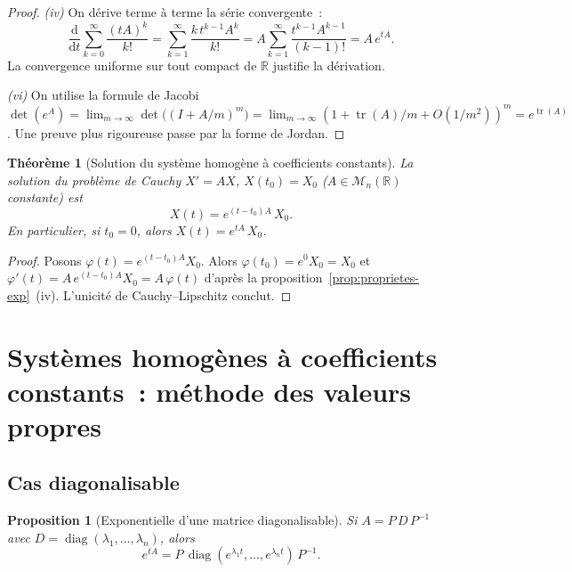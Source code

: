 \documentclass[12pt,a4paper,openany]{book}
\theoremstyle{definition}
\theoremstyle{plain}
\newtheorem{theoreme}[definition]{Théorème}
\newtheorem{proposition}[definition]{Proposition}
\theoremstyle{remark}
\newcommand{\R}{\mathbb{R}}
\newcommand{\dd}{\mathrm{d}}
\DeclareMathOperator{\tr}{tr}
\DeclareMathOperator{\diag}{diag}
\begin{document}
\begin{proof}
  \emph{(iv)} On dérive terme à terme la série convergente~:
  \[
    \frac{\dd}{\dd t} \sum_{k=0}^{\infty} \frac{(tA)^k}{k!}
    = \sum_{k=1}^{\infty} \frac{k\,t^{k-1}A^k}{k!}
    = A \sum_{k=1}^{\infty} \frac{t^{k-1}A^{k-1}}{(k-1)!}
    = A\,e^{tA}.
  \]
  La convergence uniforme sur tout compact de $\R$ justifie la dérivation.

  \emph{(vi)} On utilise la formule de Jacobi
  $\det(e^A) = \lim_{m\to\infty}\det\bigl((I+A/m)^m\bigr)
  = \lim_{m\to\infty}(1+\tr(A)/m + O(1/m^2))^m = e^{\tr(A)}$.
  Une preuve plus rigoureuse passe par la forme de Jordan.
\end{proof}

\begin{theoreme}[Solution du système homogène à coefficients constants]\label{thm:sol-syst-homogene}
  La solution du problème de Cauchy $X' = AX$, $X(t_0) = X_0$
  ($A \in \mathcal{M}_n(\R)$ constante) est
  \begin{equation}\label{eq:sol-syst-homogene}
    X(t) = e^{(t-t_0)A}\,X_0.
  \end{equation}
  En particulier, si $t_0 = 0$, alors $X(t) = e^{tA}\,X_0$.
\end{theoreme}

\begin{proof}
  Posons $\varphi(t) = e^{(t-t_0)A}X_0$. Alors
  $\varphi(t_0) = e^0 X_0 = X_0$ et
  $\varphi'(t) = A\,e^{(t-t_0)A}X_0 = A\,\varphi(t)$
  d'après la proposition~\ref{prop:proprietes-exp}~(iv).
  L'unicité de Cauchy--Lipschitz conclut.
\end{proof}

\section{Systèmes homogènes à coefficients constants~: méthode des
  valeurs propres}\label{sec:methode-vp}

\subsection{Cas diagonalisable}\label{subsec:cas-diag}

\begin{proposition}[Exponentielle d'une matrice diagonalisable]\label{prop:exp-diag}
  Si $A = P\,D\,P^{-1}$ avec $D = \diag(\lambda_1,\ldots,\lambda_n)$,
  alors
  \[
    e^{tA} = P\,\diag(e^{\lambda_1 t},\ldots,e^{\lambda_n t})\,P^{-1}.
  \]
\end{proposition}
\end{document}
